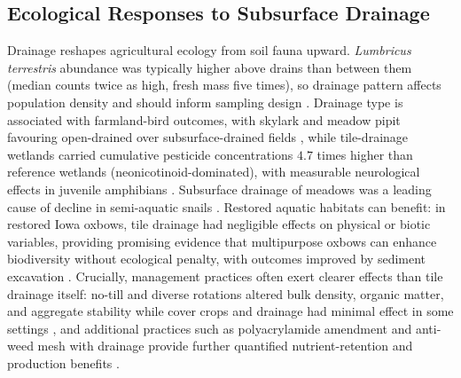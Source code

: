 \subsection{Ecological Responses to Subsurface Drainage}

Drainage reshapes agricultural ecology from soil fauna upward. \textit{Lumbricus
terrestris} abundance was typically higher above drains than between them (median
counts twice as high, fresh mass five times), so drainage pattern affects
population density and should inform sampling design
\parencite{Nuutinen2001,Nuutinen2011}. Drainage type is associated with
farmland-bird outcomes, with skylark and meadow pipit favouring open-drained over
subsurface-drained fields \parencite{Marja2013}, while tile-drainage wetlands
carried cumulative pesticide concentrations $4.7$ times higher than reference
wetlands (neonicotinoid-dominated), with measurable neurological effects in
juvenile amphibians \parencite{Campbell2023}. Subsurface drainage of meadows was
a leading cause of decline in semi-aquatic snails \parencite{Dreyfuss2018}.
Restored aquatic habitats can benefit: in restored Iowa oxbows, tile drainage had
negligible effects on physical or biotic variables, providing promising evidence
that multipurpose oxbows can enhance biodiversity without ecological penalty, with
outcomes improved by sediment excavation
\parencite{Leberg2024,Winikoff2020,Harris2018}. Crucially, management practices
often exert clearer effects than tile drainage itself: no-till and diverse
rotations altered bulk density, organic matter, and aggregate stability while
cover crops and drainage had minimal effect in some settings
\parencite{Saha2024,Hermawan1996,Sherbine2023}, and additional practices such as
polyacrylamide amendment and anti-weed mesh with drainage provide further
quantified nutrient-retention and production benefits
\parencite{Jiang2010,GiménezValero2024,GiménezValero2025}.